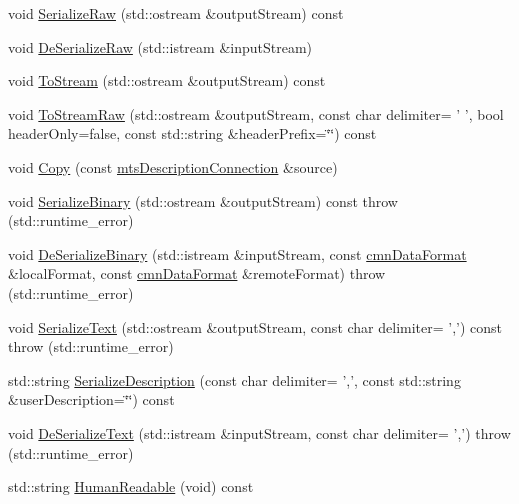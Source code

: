 \begin{DoxyCompactItemize}
\item 
void \hyperlink{classmts_description_connection_ab75805db6e073fe6f8366ac00710a602}{Serialize\-Raw} (std\-::ostream \&output\-Stream) const 
\item 
void \hyperlink{classmts_description_connection_a8c4d514255418b84007f2bc8a288e6a4}{De\-Serialize\-Raw} (std\-::istream \&input\-Stream)
\item 
void \hyperlink{classmts_description_connection_ae0a1b543582b4fd912aeb2a1ce47ace4}{To\-Stream} (std\-::ostream \&output\-Stream) const 
\item 
void \hyperlink{classmts_description_connection_a0dca0e7c66aff48c9192e5c979a489ec}{To\-Stream\-Raw} (std\-::ostream \&output\-Stream, const char delimiter= ' ', bool header\-Only=false, const std\-::string \&header\-Prefix=\char`\"{}\char`\"{}) const 
\item 
void \hyperlink{classmts_description_connection_a455e13e6e18c7475423d40059d07cc19}{Copy} (const \hyperlink{classmts_description_connection}{mts\-Description\-Connection} \&source)
\item 
void \hyperlink{classmts_description_connection_ae33f622506c0b93738b30003cf5525d7}{Serialize\-Binary} (std\-::ostream \&output\-Stream) const   throw (std\-::runtime\-\_\-error)
\item 
void \hyperlink{classmts_description_connection_a1cb5809592504df7a8bdae4fc4da6b59}{De\-Serialize\-Binary} (std\-::istream \&input\-Stream, const \hyperlink{classcmn_data_format}{cmn\-Data\-Format} \&local\-Format, const \hyperlink{classcmn_data_format}{cmn\-Data\-Format} \&remote\-Format)  throw (std\-::runtime\-\_\-error)
\item 
void \hyperlink{classmts_description_connection_a557a83997e0896d5e30c077b3378b10b}{Serialize\-Text} (std\-::ostream \&output\-Stream, const char delimiter= ',') const   throw (std\-::runtime\-\_\-error)
\item 
std\-::string \hyperlink{classmts_description_connection_aa49c013b25380ab8a7bce24b64f9b22f}{Serialize\-Description} (const char delimiter= ',', const std\-::string \&user\-Description=\char`\"{}\char`\"{}) const 
\item 
void \hyperlink{classmts_description_connection_a247b6cc35a441df47843c3da74aaaa1a}{De\-Serialize\-Text} (std\-::istream \&input\-Stream, const char delimiter= ',')  throw (std\-::runtime\-\_\-error)
\item 
std\-::string \hyperlink{classmts_description_connection_a3c62f6ce3ba5c468c8b507b1b1ba710a}{Human\-Readable} (void) const 

\end{DoxyCompactItemize}
